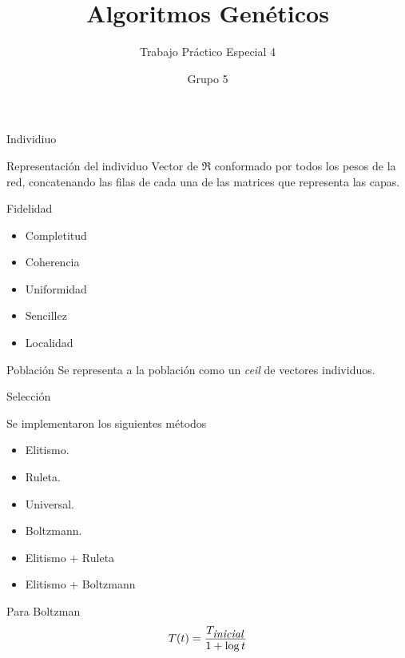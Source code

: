 \documentclass{beamer}
\author{Grupo 5}
\title{Algoritmos Genéticos}
\subtitle{Trabajo Práctico Especial 4}
\institute[Sistemas de Inteligencia Artificial]{Sistemas de Inteligencia Artificial}
\begin{document}
\maketitle

\begin{frame}{Individiuo}
\begin{block}{Representación del individuo}
Vector de $\Re$  conformado por todos los pesos de la red, concatenando las filas de cada una de las matrices que representa las capas.
\end{block}

\begin{block}{Fidelidad}
\begin{itemize}
\item Completitud
\item Coherencia
\item Uniformidad
\item Sencillez
\item Localidad
\end{itemize}
\end{block}

\begin{block}{Población}
Se representa a la población como un \textit{ceil} de vectores individuos.
\end{block}
\end{frame}


\begin{frame}{Selección}
\begin{block}{Se implementaron los siguientes métodos}
\begin{itemize}
       \item Elitismo.
       \item Ruleta.
       \item Universal.
       \item Boltzmann.
       \item Elitismo + Ruleta
       \item Elitismo + Boltzmann
\end{itemize}
\end{block}

\begin{block}{Para Boltzman}
\begin{equation}
 T(t) = \frac{T_{\mbox{\emph{inicial}}}}{1 + \log t}
\end{equation}
\end{block}
\end{frame}
\end{document}
